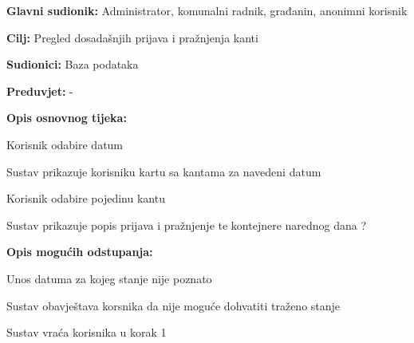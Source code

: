 				\noindent {}
					\begin{packed_item}
	
						\item \textbf{Glavni sudionik: }Administrator, komunalni radnik, građanin, anonimni korisnik
						\item  \textbf{Cilj:} Pregled dosadašnjih prijava i pražnjenja kanti
						\item  \textbf{Sudionici:} Baza podataka
						\item  \textbf{Preduvjet:} -
						\item  \textbf{Opis osnovnog tijeka:}
						
						\item[] \begin{packed_enum}
	
							\item Korisnik odabire datum
							\item Sustav prikazuje korisniku kartu sa kantama za navedeni datum
							\item Korisnik odabire pojedinu kantu
							\item Sustav prikazuje popis prijava i pražnjenje te kontejnere narednog dana ?
						\end{packed_enum}
						
						\item  \textbf{Opis mogućih odstupanja:}
						
						\item[] \begin{packed_item}
	
							\item[1.a] Unos datuma za kojeg stanje nije poznato
							
							\item[] \begin{packed_enum}
								
								\item Sustav obavještava korsnika da nije moguće dohvatiti traženo stanje
								\item Sustav vraća korisnika u korak 1
								
							\end{packed_enum}
							
							
						\end{packed_item}
					\end{packed_item}			
				\noindent {}

